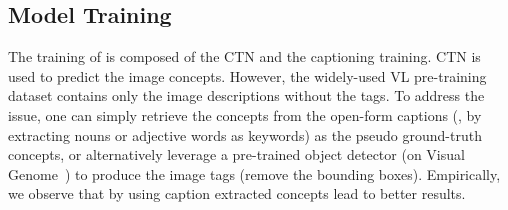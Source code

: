 \subsection{Model Training}
\label{sec:training}
The training of \vitcap is composed of the CTN and the captioning training.
CTN is used to predict the image concepts. However, the widely-used VL pre-training dataset contains only the image descriptions without the tags. To address the issue, one can simply retrieve the concepts from the open-form captions (\eg, by extracting nouns or adjective words as keywords) as the pseudo ground-truth concepts, or alternatively leverage a pre-trained object detector (\eg on Visual Genome~\citep{krishna2017visual}) to produce the image tags (remove the bounding boxes). Empirically, we observe that by using caption extracted concepts lead to better results.
